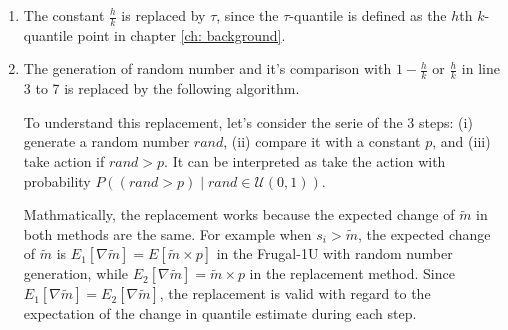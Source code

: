 \begin{enumerate}
    \item The constant $\frac{h}{k}$ is replaced by $\tau$, since the $\tau$-quantile is defined
     as the $h$th $k$-quantile point in chapter \ref{ch: background}.
    \item The generation of random number and it's comparison with $1-\frac{h}{k}$ or $\frac{h}{k}$
    in line 3 to 7 is replaced by the following algorithm.
    \begin{algorithm}
        \begin{algorithmic}[1]
            \setcounter{ALG@line}{2}
            \State{ }   
            \EndIf 
        \end{algorithmic}
    \end{algorithm}

    
    To understand this replacement, let's consider the serie of the 3 steps: 
    (i) generate a random number $rand$, 
    (ii) compare it with a constant $p$, and
    (iii) take action if $rand > p$. 
    It can be interpreted as take the action with probability 
    $P((rand > p) \mid rand \in \mathcal{U}(0,1))$. 

    Mathmatically, the replacement works because the expected change of
    $\tilde{m}$ in both methods are the same. 
    For example when $s_i > \tilde{m}$, 
    the expected change of $\tilde{m}$ is
    $E_1[\nabla \tilde{m}] = E[\tilde{m} \times p]$ in the Frugal-1U with 
    random number generation,
    while 
    $E_2[\nabla \tilde{m}] = \tilde{m} \times p$ in the replacement method.
    Since $E_1[\nabla \tilde{m}] = E_2[\nabla \tilde{m}]$, the replacement is valid
    with regard to the expectation of the change in quantile estimate during each step.

\end{enumerate}


